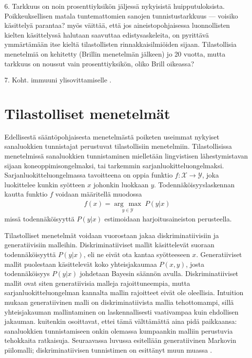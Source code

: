 \documentclass[utf8,bachelor,manualbib]{gradu3}
\newcommand{\argmax}[1]{\underset{#1}{\operatorname{arg}\,\operatorname{max}}\;}
\begin{document}
6. Tarkkuus on noin prosenttiyksikön jäljessä nykyisistä huipputuloksista. Poikkeuksellisen matala tuntemattomien sanojen tunnistustarkkuus --- voisiko käsittelyä parantaa? \citet{brill1995} myös väittää, että jos aineistopohjaisessa luonnollisten kielten käsittelyssä halutaan saavuttaa edistysaskeleita, on pyrittävä ymmärtämään itse kieltä tilastollisten rinnakkaisilmiöiden sijaan. Tilastollisia menetelmiä on kehitetty (Brillin menetelmän jälkeen) jo 20 vuotta, mutta tarkkuus on noussut vain prosenttiyksikön, oliko Brill oikeassa? \citep{manning2011} 

7. Koht. immuuni ylisovittamiselle \citep{ramshaw1994}.

\chapter{Tilastolliset menetelmät}

Edellisestä sääntöpohjaisesta menetelmästä poiketen useimmat nykyiset sanaluokkien tunnistajat perustuvat tilastollisiin menetelmiin. Tilastollisissa menetelmissä sanaluokkien tunnistaminen mielletään lingvistisen lähestymistavan sijaan koneoppimisongelmaksi, tai tarkemmin sarjanluokitteluongelmaksi. Sarjanluokitteluongelmassa tavoitteena on oppia funktio $f: \mathcal{X} \to \mathcal{Y}$, joka luokittelee kunkin syötteen $x$ johonkin luokkaan $y$. Todennäköisyyslaskennan kautta funktio $f$ voidaan määritellä muodossa
\begin{align}
f(x) = \argmax{y \in \mathcal{Y}} P(y|x)
\end{align}
missä todennäköisyyttä $P(y|x)$ estimoidaan harjoitusaineiston perusteella.

Tilastolliset menetelmät voidaan vuorostaan jakaa diskriminatiivisiin ja generatiivisiin malleihin. Diskriminatiiviset mallit käsittelevät suoraan todennäköisyyttä $P(y|x)$, eli ne eivät ota kantaa syötteeseen $x$. Generatiiviset mallit puolestaan käsittelevät koko yhteisjakaumaa $P(x,y)$, josta todennäköisyys $P(y|x)$ johdetaan Bayesin säännön avulla. Diskriminatiiviset mallit ovat siten generatiivisia malleja rajoittuneempia, mutta sarjanluokitteluongelman kannalta mallin rajoitteet eivät ole oleellisia. Intuition mukaan generatiivinen malli on diskriminatiivista mallia tehottomampi, sillä yhteisjakauman mallintaminen on laskennallisesti vaativampaa kuin ehdollisen jakauman.  kuitenkin osoittavat, ettei tämä välttämättä aina pidä paikkaansa: sanaluokkien tunnistamiseen onkin olemassa kumpaankin malliin perustuvia tehokkaita ratkaisuja. Seuraavassa luvussa esitellään generatiivinen Markovin piilomalli; diskriminatiivisen tunnistimen on esittänyt muun muassa \citet{ratnaparkhi1996}.
\end{document}

